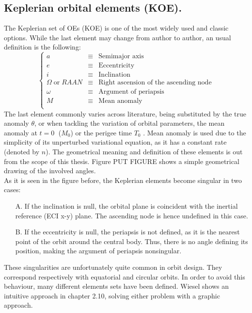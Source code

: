 	\subsection{Keplerian orbital elements (KOE).}
	\indent The Keplerian set of OEs (KOE) is one of the most widely used and classic options. While the last element may change from author to author, an usual definition is the following:
	\begin{equation}
	\left\{ 
	\begin{array}{lll}
	a & \equiv & \text{Semimajor axis}\\
	e & \equiv & \text{Eccentricity}\\
	i & \equiv & \text{Inclination}\\
	\Omega \; \text{or} \; RAAN & \equiv & \text{Right ascension of the ascending node}\\
	\omega & \equiv & \text{Argument of periapsis}\\
	M & \equiv & \text{Mean anomaly}\\
	\end{array}
	\right.
	\end{equation}
	\indent The last element commonly varies across literature, being substituted by the true anomaly $\theta$, or when tackling the variation of orbital parameters, the mean anomaly at $t = 0 \; $ ($M_0$) or the perigee time $T_0$ \cite{Wiesel}. Mean anomaly is used due to the simplicity of its unperturbed variational equation, as it has a constant rate (denoted by $n$). The geometrical meaning and definition of these elements is out from the scope of this thesis. Figure PUT FIGURE shows a simple geometrical drawing of the involved angles.\\
	\indent As it is seen in the figure before, the Keplerian elements become singular in two cases:\\
	\begin{itemize}
	\item[A.] If the inclination is null, the orbital plane is coincident with the inertial reference (ECI x-y) plane. The ascending node is hence undefined in this case. 
	\item[B.] If the eccentricity is null, the periapsis is not defined, as it is the nearest point of the orbit around the central body. Thus, there is no angle defining its position, making the argument of periapsis nonsingular. 
	\end{itemize}
	\indent These singularities are unfortunately quite common in orbit design. They correspond respectively with equatorial and circular orbits. In order to avoid this behaviour, many different elements sets have been defined. Wiesel \cite{Wiesel} shows an intuitive approach in chapter 2.10, solving either problem with a graphic approach.\\
